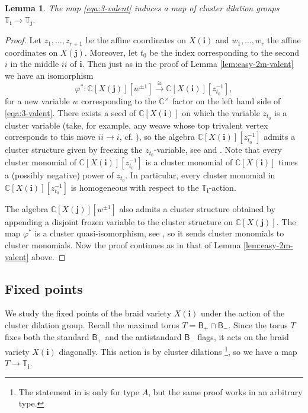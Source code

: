 \documentclass[a4paper, 11pt]{amsart}
\newcommand{\borel}{\mathsf{B}}
\newcommand{\word}[1]{\mathbf{#1}}
\newcommand{\C}{\mathbb{C}}
\newcommand{\dil}[1]{\mathbb{T}_{#1}}
\newtheorem{lemma}[theorem]{Lemma}%
\theoremstyle{definition}
\def\CC{\mathbb{C}}
\begin{document}
\begin{lemma}\label{lem:3valent-dilation}
The map \eqref{eqa:3-valent} induces a map of cluster dilation groups $\dil{\word{i}} \to \dil{\word{j}}$.
\end{lemma}
\begin{proof}
Let $z_1, \dots, z_{r+1}$ be the affine coordinates on $X(\word{i})$ and $w_1, \dots, w_r$ the affine coordinates on $X(\word{j})$. Moreover, let $t_0$ be the index corresponding to the second $i$ in the middle $ii$ of $\word{i}$. Then just as in the proof of Lemma \ref{lem:easy-2m-valent} we have an isomorphism
\[
\varphi^{\ast}: \C[X(\word{j})][w^{\pm 1}] \xrightarrow{\cong} \C[X(\word{i})][z_{t_0}^{-1}],
\]
for a new variable $w$ corresponding to the $\CC^\times$ factor on the left hand side of  \eqref{eqa:3-valent}.
There exists a seed of $\C[X(\word{i})]$ on which the variable $z_{t_0}$ is a cluster variable (take, for example, any weave whose top trivalent vertex corresponds to this move $ii \to i$, cf. \cite[Theorem 5.19]{CGGLSS}), so the algebra $\C[X(\word{i})][z_{t_0}^{-1}]$ admits a cluster structure given by freezing the $z_{t_0}$-variable, see \cite[Theorem 5.35]{CGGLSS} and \cite[Lemma 3.4]{muller-locally-acyclic}. Note that every cluster monomial of $\C[X(\word{i})][z_{t_0}^{-1}]$ is a cluster monomial of $\C[X(\word{i})]$ times a (possibly negative) power of $z_{t_0}$. In particular, every cluster monomial in $\C[X(\word{i})][z_{t_0}^{-1}]$ is homogeneous with respect to the $\dil{\word{i}}$-action.

The algebra $\C[X(\word{j})][w^{\pm 1}]$ also admits a cluster structure obtained by appending a disjoint frozen variable to the cluster structure on $\C[X(\word{j})]$. The map $\varphi^{\ast}$ is a cluster quasi-isomorphism, see \cite[Lemma 4.19]{CGSS}, so it sends cluster monomials to cluster monomials. Now the proof continues as in that of Lemma \ref{lem:easy-2m-valent} above.
\end{proof}

    \subsection{Fixed points} We study the fixed points of the braid variety $X(\word{i})$ under the action of the cluster dilation group. Recall the maximal torus $T = \borel_+ \cap \borel_{-}$. Since the torus $T$ fixes both the standard $\borel_{+}$ and the antistandard $\borel_{-}$ flags, it acts on the braid variety $X(\word{i})$ diagonally. This action is by cluster dilations \cite[Corollary 4.29]{CGSS}\footnote{The statement in \cite{CGSS} is only for type $A$, but the same proof works in an arbitrary type.}, so we have a map $T \to \dil{\word{i}}$. 
    
\end{document}
